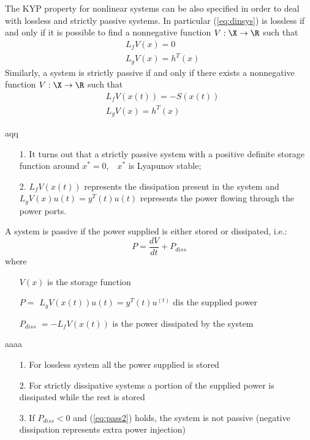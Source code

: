 %
The KYP property for nonlinear systems can be also specified in order to deal with lossless and strictly passive systems. In particular (\ref{eq:dinsys}) is lossless if and only if it is possible to find a nonnegative function $V:\X\rightarrow\R$ such that
%
\begin{align*}
&L_fV(x)=0\\
&L_gV(x)=h^T(x)
\end{align*}
%
Similarly, a system is strictly passive if and only if there exists a nonnegative function $V:\X\rightarrow\R$ such that
%
\begin{align*}
&L_fV(x(t)) = -S(x(t))\\
&L_gV(x)=h^T(x)
\end{align*}
%
\begin{rem}{\color{white}aqq}
	\begin{itemize}
		\item [1.] It turns out that a strictly passive system with a positive definite storage function around $x^* = 0$,　$x^*$ is Lyapunov stable;
		\item [2.] $L_fV(x(t))$ represents the dissipation present in the system and $L_gV(x)u(t)=y^T(t)u(t)$ represents the power flowing through the power ports.
	\end{itemize}	
\end{rem}
%
\begin{defn}
	A system is passive if the power supplied is either stored or dissipated, i.e.:
	\begin{equation}\label{eq:pass2}
	P=\frac{dV}{dt}+P_{diss}
	\end{equation}
	where
	\begin{itemize}
		\item[$V(x)$] is the storage function
		\item[$P=$]$L_gV(x(t))u(t)=y^T(t)u^(t)$ dis the supplied power 
		\item [$P_{diss}$]$=-L_fV(x(t))$ is the power dissipated by the system
	\end{itemize}
\end{defn}
%
\newpage
\begin{rem}{\color{white}aaaa}
	\begin{itemize}
		\item [1.] For lossless system all the power supplied is stored
		\item [2.] For strictly dissipative systems a portion of the supplied power is dissipated while the rest is stored 
		\item [3.] If $P_{diss}<0$ and (\ref{eq:pass2}) holds, the system is not passive (negative dissipation represents extra power injection)
	\end{itemize}
\end{rem}
%
